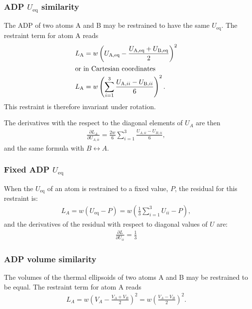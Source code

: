 \documentclass[11pt]{article}
\newcommand{\partialder}[2]{\frac{\partial #1}{\partial #2}}
\begin{document}
\subsubsection{ADP $U_\text{eq}$ similarity}

The ADP of two atoms A and B may be restrained to have the same $U_\text{eq}$. The restraint term for atom A reads
\begin{align}
L_\text{A} &= w  \left(U_\text{A,eq}-\frac{U_\text{A,eq}+U_\text{B,eq}}{2}\right)^2 \\
\intertext{or in Cartesian coordinates}
L_\text{A} &= w \left( \sum_{i=1}^3 \frac{U_{\text{A},ii} - U_{\text{B},ii}}{6} \right) ^2.
\end{align}
This restraint is therefore invariant under rotation.

The derivatives with the respect to the diagonal elements of $U_{A}$ are then
\begin{align}
\partialder{L_{A}}{U_{A,ii}} = \frac{2w}{6} \sum_{i=1}^3 \frac{U_{A,ii} - U_{B,ii}}{6} ,
\end{align}
and the same formula with $B \leftrightarrow A$.

\subsubsection{Fixed ADP $U_\text{eq}$}
When the $U_\text{eq}$ of an atom is restrained to a fixed value, $P$, the residual for this restraint is:
\begin{align}
L_{A} = w  (U_\text{eq}-P) = w \left(\frac{1}{3}\sum_{i=1}^3 U_{ii}-P \right),
\end{align}
and the derivatives of the residual with respect to diagonal values of $U$ are:
\begin{align}
\partialder{L}{U_{ii}} = \frac{1}{3}
\end{align}

\subsubsection{ADP volume similarity}
The volumes of the thermal ellipsoids of two atoms A and B may be restrained to be equal. The restraint term for atom A reads
\begin{align}
L_{A} = w  \left(V_{A}-\frac{V_{A}+V_{B}}{2}\right)^2 = w \left( \frac{V_{A}-V_{B}}{2}\right) ^2.
\end{align}
\end{document}
